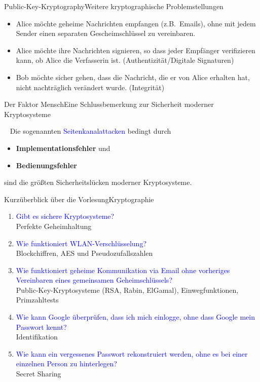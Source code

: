 \documentclass{beamer}
\newcommand{\tb}[1]{{\textcolor{blue}{#1}}}
\theoremstyle{plain}
\begin{document}
\begin{frame}{Public-Key-Kryptography}{Weitere kryptographische Problemstellungen}

\begin{itemize}
 \item Alice möchte geheime Nachrichten empfangen (z.B.~Emails), ohne mit jedem Sender einen separaten Gescheimschlüssel zu vereinbaren.
 \item Alice möchte ihre Nachrichten signieren, so dass jeder Empfänger verifizieren kann, ob Alice die Verfasserin ist. (Authentizität/Digitale Signaturen)
 \item Bob möchte sicher gehen, dass die Nachricht, die er von Alice erhalten hat, nicht nachträglich verändert wurde. (Integrität)
\end{itemize}
\end{frame}

\begin{frame}{Der Faktor Mensch}{Eine Schlussbemerkung zur Sicherheit moderner Kryptosysteme}
\begin{alertblock}{~}
 Die sogenannten \tb{Seitenkanalattacken} bedingt durch
 \begin{itemize}
  \item \textbf{Implementationsfehler} und
  \item \textbf{Bedienungsfehler} 
 \end{itemize}
 sind die größten Sicherheitslücken moderner Kryptosysteme.
\end{alertblock}

\end{frame}

\begin{frame}{Kurzüberblick über die Vorlesung}{Kryptographie}

\begin{enumerate}[<+->]
 \item  \tb{Gibt es sichere Kryptosysteme?} \\
 Perfekte Geheimhaltung
 \item \tb{Wie funktioniert WLAN-Verschlüsselung?}\\
 Blockchiffren, AES und Pseudozufallszahlen 
 \item \tb{Wie funktioniert geheime Kommunikation via Email ohne vorheriges Vereinbaren eines gemeinsamen Geheimschlüssels?}\\
 Public-Key-Kryptosysteme (RSA, Rabin, ElGamal), Einwegfunktionen, Primzahltests
 \item \tb{Wie kann Google überprüfen, dass ich mich einlogge, ohne dass Google mein Passwort kennt?}\\
 Identifikation
 \item \tb{Wie kann ein vergessenes Passwort rekonstruiert werden, ohne es bei einer einzelnen Person zu hinterlegen?} \\
 Secret Sharing
\end{enumerate}
 
\end{frame}
\end{document}
